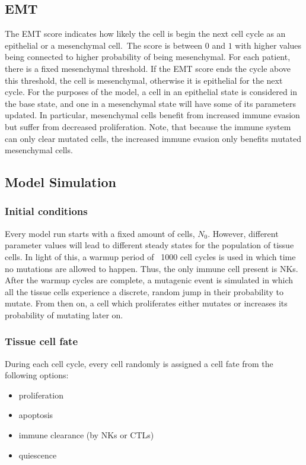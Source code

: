 \documentclass{article}
\begin{document}
\subsection{EMT}\label{EMT}
The EMT score indicates how likely the cell is begin the next cell cycle as an epithelial or a mesenchymal cell.\
The score is between $0$ and $1$ with higher values being connected to higher probability of being mesenchymal.
For each patient, there is a fixed mesenchymal threshold.
If the EMT score ends the cycle above this threshold, the cell is mesenchymal, otherwise it is epithelial for the next cycle.
For the purposes of the model, a cell in an epithelial state is considered in the base state, and one in a mesenchymal state will have some of its parameters updated.
In particular, mesenchymal cells benefit from increased immune evasion but suffer from decreased proliferation.
Note, that because the immune system can only clear mutated cells, the increased immune evasion only benefits mutated mesenchymal cells.

\subsection{Model Simulation}

\subsubsection{Initial conditions} Every model run starts with a fixed amount of cells, $N_0$.
However, different parameter values will lead to different steady states for the population of tissue cells.
In light of this, a warmup period of ~1000 cell cycles is used in which time no mutations are allowed to happen.
Thus, the only immune cell present is NKs.
After the warmup cycles are complete, a mutagenic event is simulated in which all the tissue cells experience a discrete, random jump in their probability to mutate.
From then on, a cell which proliferates either mutates or increases its probability of mutating later on.

\subsubsection{Tissue cell fate}
During each cell cycle, every cell randomly is assigned a cell fate from the following options:
\begin{itemize}
\item proliferation
\item apoptosis
\item immune clearance (by NKs or CTLs)
\item quiescence
\end{itemize}
\end{document}
